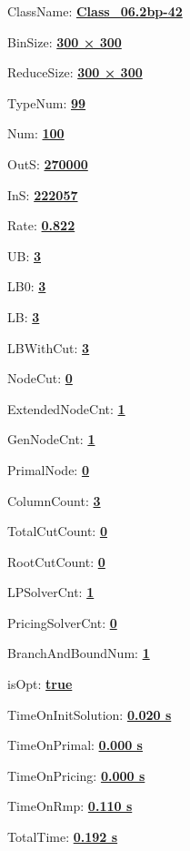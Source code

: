 \documentclass[11pt]{article}
\begin{document}
\pagestyle{empty}


ClassName: \underline{\textbf{Class_06.2bp-42}}
\par
BinSize: \underline{\textbf{300 × 300}}
\par
ReduceSize: \underline{\textbf{300 × 300}}
\par
TypeNum: \underline{\textbf{99}}
\par
Num: \underline{\textbf{100}}
\par
OutS: \underline{\textbf{270000}}
\par
InS: \underline{\textbf{222057}}
\par
Rate: \underline{\textbf{0.822}}
\par
UB: \underline{\textbf{3}}
\par
LB0: \underline{\textbf{3}}
\par
LB: \underline{\textbf{3}}
\par
LBWithCut: \underline{\textbf{3}}
\par
NodeCut: \underline{\textbf{0}}
\par
ExtendedNodeCnt: \underline{\textbf{1}}
\par
GenNodeCnt: \underline{\textbf{1}}
\par
PrimalNode: \underline{\textbf{0}}
\par
ColumnCount: \underline{\textbf{3}}
\par
TotalCutCount: \underline{\textbf{0}}
\par
RootCutCount: \underline{\textbf{0}}
\par
LPSolverCnt: \underline{\textbf{1}}
\par
PricingSolverCnt: \underline{\textbf{0}}
\par
BranchAndBoundNum: \underline{\textbf{1}}
\par
isOpt: \underline{\textbf{true}}
\par
TimeOnInitSolution: \underline{\textbf{0.020 s}}
\par
TimeOnPrimal: \underline{\textbf{0.000 s}}
\par
TimeOnPricing: \underline{\textbf{0.000 s}}
\par
TimeOnRmp: \underline{\textbf{0.110 s}}
\par
TotalTime: \underline{\textbf{0.192 s}}
\par
\newpage
\end{document}
